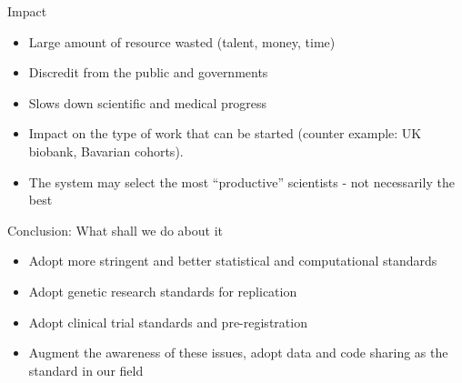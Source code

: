 \documentclass[ignorenonframetext,]{beamer}
\begin{document}
\begin{frame}

\begin{block}{Impact}

\begin{itemize}[<+->]
\itemsep1pt\parskip0pt
\item
  Large amount of resource wasted (talent, money, time)
\item
  Discredit from the public and governments
\item
  Slows down scientific and medical progress
\item
  Impact on the type of work that can be started (counter example: UK
  biobank, Bavarian cohorts).
\item
  The system may select the most ``productive'' scientists - not
  necessarily the best
\end{itemize}

\end{block}

\end{frame}

\begin{frame}{Conclusion: What shall we do about it}

\begin{itemize}[<+->]
\itemsep1pt\parskip0pt
\item
  Adopt more stringent and better statistical and computational
  standards
\item
  Adopt genetic research standards for replication
\item
  Adopt clinical trial standards and pre-registration
\item
  Augment the awareness of these issues, adopt data and code sharing as
  the standard in our field
\end{itemize}

\end{frame}
\end{document}
